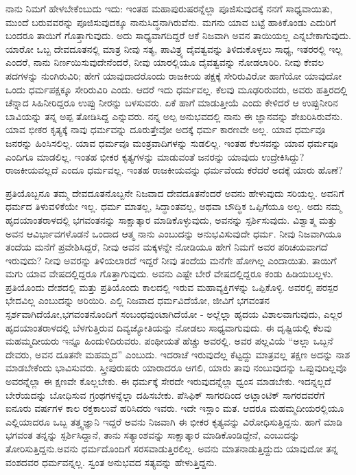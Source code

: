 ನಾನು ನಿಮಗೆ ಹೇಳಬೇಕೆಂಬುದು ಇದು: ಇಂತಹ ಮಹಾಪುರುಷರನ್ನೆಲ್ಲಾ ಪೂಜಿಸುವುದಕ್ಕೆ ನನಗೆ ಸಾಧ್ಯವಾಯಿತು, ಮುಂದೆ ಬರುವವರನ್ನು ಪೂಜಿಸುವುದಕ್ಕೂ ನಾನು\break ಸಿದ್ಧನಾಗಿರುವೆನು. ಮಗನು ಯಾವ ಬಟ್ಟೆ ಹಾಕಿಕೊಂಡು ಎದುರಿಗೆ ಬಂದರೂ ತಾಯಿಗೆ ಗೊತ್ತಾಗುವುದು. ಅದು ಸಾಧ್ಯವಾಗದಿದ್ದರೆ ಆಕೆ ನಿಜವಾಗಿ ಅವನ ತಾಯಿಯಲ್ಲ ಎನ್ನ\-ಬೇಕಾಗುವುದು. ಯಾರೋ ಒಬ್ಬ ದೇವದೂತನಲ್ಲಿ ಮಾತ್ರ ನೀವು ಸತ್ಯ, ಪಾವಿತ್ರ್ಯ ದೈವತ್ವವನ್ನು ತಿಳಿದುಕೊಳ್ಳಲು ಸಾಧ್ಯ, ಇತರರಲ್ಲಿ ಇಲ್ಲ ಎಂದರೆ, ನಾನು ನಿರ್ಣಯಿಸುವುದೇನೆಂದರೆ, ನೀವು ಯಾರಲ್ಲಿಯೂ ದೈವತ್ವವನ್ನು ನೋಡಲಾರಿರಿ. ನೀವು ಕೇವಲ ಪದಗಳನ್ನು ನುಂಗಿರುವಿರಿ; ಹೇಗೆ ಯಾವುದಾದರೊಂದು ರಾಜಕೀಯ ಪಕ್ಷಕ್ಕೆ ಸೇರಿರುವಿರೋ ಹಾಗೆಯೋ ಯಾವುದೋ ಒಂದು ಧರ್ಮಪಕ್ಷಕ್ಕೂ ಸೇರಿರುವಿರಿ ಎಂದು. ಆದರೆ ಇದು ಧರ್ಮವಲ್ಲ. ಕೆಲವು ಮೂಢರಿರುವರು, ಅವರು ಹತ್ತಿರದಲ್ಲಿ ಚೆನ್ನಾದ ಸಿಹಿನೀರಿದ್ದರೂ ಉಪ್ಪು ನೀರನ್ನು ಬಳಸುವರು. ಏಕೆ ಹಾಗೆ ಮಾಡುತ್ತೀಯೆ ಎಂದು ಕೇಳಿದರೆ ಆ ಉಪ್ಪುನೀರಿನ ಬಾವಿಯನ್ನು ತನ್ನ ಅಪ್ಪ ತೋಡಿಸಿದ್ದ ಎನ್ನುವರು. ನನ್ನ ಅಲ್ಪ ಅನುಭವದಲ್ಲಿ ನಾನು ಈ ಜ್ಞಾನವನ್ನು ಶೇಖರಿಸಿರುವೆನು. ಯಾವ ಭೀಕರ ಕೃತ್ಯಕ್ಕೆ ನಾವು ಧರ್ಮವನ್ನು ದೂರುತ್ತೇವೋ ಅದಕ್ಕೆ ಧರ್ಮ ಕಾರಣವೇ ಅಲ್ಲ. ಯಾವ ಧರ್ಮವೂ ಜನರನ್ನು ಹಿಂಸಿಸಲಿಲ್ಲ. ಯಾವ ಧರ್ಮವೂ ಮಂತ್ರವಾದಿಗಳನ್ನು ಸುಡಲಿಲ್ಲ. ಇಂತಹ ಕೆಲಸವನ್ನು ಯಾವ ಧರ್ಮವೂ ಎಂದಿಗೂ ಮಾಡಲಿಲ್ಲ. ಇಂತಹ ಭೀಕರ ಕೃತ್ಯಗಳನ್ನು ಮಾಡುವಂತೆ ಜನರನ್ನು ಯಾವುದು ಉದ್ರೇಕಿಸಿದ್ದು? ರಾಜಕೀಯವಲ್ಲದೆ ಎಂದೂ ಧರ್ಮವಲ್ಲ. ಇಂತಹ ರಾಜಕೀಯವನ್ನು ಧರ್ಮವೆಂದು ಕರೆದರೆ ಅದಕ್ಕೆ ಯಾರು ಹೊಣೆ?

ಪ್ರತಿಯೊಬ್ಬನೂ ತಮ್ಮ ದೇವದೂತನೊಬ್ಬನೇ ನಿಜವಾದ ದೇವದೂತನೆಂದರೆ ಅವನು ಹೇಳುವುದು ಸರಿಯಲ್ಲ. ಅವನಿಗೆ ಧರ್ಮದ ತಿಳುವಳಿಕೆಯೇ ಇಲ್ಲ. ಧರ್ಮ ಮಾತಲ್ಲ, ಸಿದ್ಧಾಂತವಲ್ಲ, ಅಥವಾ ಬೌದ್ಧಿಕ ಒಪ್ಪಿಗೆಯೂ ಅಲ್ಲ. ಅದು ನಮ್ಮ ಹೃದಯಾಂತರಾಳದಲ್ಲಿ ಭಗವಂತನನ್ನು ಸಾಕ್ಷಾತ್ಕಾರ ಮಾಡಿಕೊಳ್ಳುವುದು, ಅವನನ್ನು ಸ್ಪರ್ಶಿಸುವುದು. ವಿಶ್ವಾತ್ಮ ಮತ್ತು ಅವನ ಆವಿರ್ಭಾವಗಳೊಡನೆ ಒಂದಾದ ಆತ್ಮ ನಾನು ಎಂಬುದನ್ನು ಅನುಭವಿಸುವುದೇ ಧರ್ಮ. ನೀವು ನಿಜವಾಗಿಯೂ ತಂದೆಯ ಮನೆಗೆ ಪ್ರವೇಶಿಸಿದ್ದರೆ, ನೀವು ಅವನ ಮಕ್ಕಳನ್ನೇ ನೋಡಿಯೂ ಹೇಗೆ ನಿಮಗೆ ಅವರ ಪರಿಚಯವಾಗದೆ ಇರುವುದು? ನೀವು ಅವರನ್ನು ತಿಳಿಯಲಾರದೆ ಇದ್ದರೆ ನೀವು ತಂದೆಯ ಮನೆಗೇ ಹೋಗಿಲ್ಲ ಎಂದಾಯಿತು. ತಾಯಿಗೆ ಮಗು ಯಾವ ವೇಷದಲ್ಲಿದ್ದರೂ ಗೊತ್ತಾಗುವುದು. ಅವನು ಎಷ್ಟೇ ಬೇರೆ ವೇಷದಲ್ಲಿದ್ದರೂ ಕಂಡು ಹಿಡಿಯಬಲ್ಲಳು. ಪ್ರತಿಯೊಂದು ದೇಶದಲ್ಲಿ ಮತ್ತು ಪ್ರತಿಯೊಂದು ಕಾಲದಲ್ಲಿ ಇರುವ ಮಹಾವ್ಯಕ್ತಿಗಳನ್ನು ಒಪ್ಪಿಕೊಳ್ಳಿ. ಅವರಲ್ಲಿ ಪರಸ್ಪರ ಭೇದವಿಲ್ಲ ಎಂಬುದನ್ನು ಅರಿಯಿರಿ. ಎಲ್ಲಿ ನಿಜವಾದ ಧರ್ಮವಿದೆಯೋ, ಜೀವಿಗೆ ಭಗವಂತನ ಸ್ಪರ್ಶವಾಗಿದೆಯೋ,\break ಭಗವಂತನೊಂದಿಗೆ ಸಂಬಂಧವುಂಟಾಗಿದೆಯೋ - ಅಲ್ಲೆಲ್ಲಾ ಹೃದಯ ವಿಶಾಲವಾಗುವುದು, ಎಲ್ಲರ ಹೃದಯಾಂತರಾಳದಲ್ಲಿ ಬೆಳಗುತ್ತಿರುವ ದಿವ್ಯಜ್ಯೋತಿಯನ್ನು ನೋಡಲು ಸಾಧ್ಯವಾಗುವುದು. ಈ ದೃಷ್ಟಿಯಲ್ಲಿ ಕೆಲವು ಮಹಮ್ಮದೀಯರು ಇನ್ನೂ ಹಿಂದುಳಿದಿರುವರು. ಪಂಥೀಯತೆ ಹೆಚ್ಚು ಅವರಲ್ಲಿ. ಅವರ ಪಲ್ಲವಿಯೆ “ಅಲ್ಲಾ ಒಬ್ಬನೆ ದೇವರು, ಅವನ ದೂತನೇ ಮಹಮ್ಮದ” ಎಂಬುದು. ಇದರಾಚೆ ಇರುವುದೆಲ್ಲ ಕೆಟ್ಟದ್ದು ಮಾತ್ರವಲ್ಲ ತಕ್ಷಣ ಅದನ್ನು ನಾಶ ಮಾಡಬೇಕೆಂದು ಭಾವಿಸುವರು. ಸ್ತ್ರೀಪುರುಷರು ಯಾರಾದರೂ ಆಗಲಿ, ಯಾರು ತಾವು ನಂಬುವುದನ್ನು ಒಪ್ಪುವುದಿಲ್ಲವೊ ಅವರನ್ನೆಲ್ಲಾ ಈ ಕ್ಷಣವೇ ಕೊಲ್ಲಬೇಕು. ಈ ಧರ್ಮಕ್ಕೆ ಸೇರದೇ ಇರುವುದನ್ನೆಲ್ಲಾ ಧ್ವಂಸ ಮಾಡಬೇಕು. ಇದನ್ನಲ್ಲದೆ ಬೇರೆಯದನ್ನು ಬೋಧಿಸುವ ಗ್ರಂಥಗಳನ್ನೆಲ್ಲಾ ದಹಿಸಬೇಕು. ಪೆಸಿಫಿಕ್​ ಸಾಗರದಿಂದ ಅಟ್ಲಾಂಟಿಕ್​ ಸಾಗರದವರೆಗೆ ಐನೂರು ವರ್ಷಗಳ ಕಾಲ ರಕ್ತಕಾಲುವೆ ಹರಿಸಿದರು ಇವರು. ಇದೇ ಇಸ್ಲಾಂ ಮತ. ಆದರೂ ಮಹಮ್ಮದೀಯರಲ್ಲಿಯೂ ಎಲ್ಲಿಯಾದರೂ ಒಬ್ಬ ತತ್ತ್ವಜ್ಞಾನಿ ಇದ್ದರೆ ಅವನು ನಿಜವಾಗಿ ಈ ಭೀಕರ ಕೃತ್ಯವನ್ನು ವಿರೋಧಿಸುತ್ತಿದ್ದನು. ಹಾಗೆ ಮಾಡಿ ಭಗವಂತ ತನ್ನನ್ನು ಸ್ಪರ್ಶಿಸಿದ್ದಾನೆ, ತಾನು ಸತ್ಯಾಂಶವನ್ನು ಸಾಕ್ಷಾತ್ಕಾರ ಮಾಡಿಕೊಂಡಿದ್ದೇನೆ, ಎಂಬುದನ್ನು ತೋರಿಸುತ್ತಿದ್ದನು.ಅವನು ಧರ್ಮದೊಂದಿಗೆ ಸರಸವಾಡುತ್ತಿರಲಿಲ್ಲ. ಅವನು ಮಾತನಾಡುತ್ತಿದ್ದುದು ಯಾವುದೋ ತನ್ನ ವಂಶದವರ ಧರ್ಮವನ್ನಲ್ಲ. ಸ್ವಂತ ಅನುಭವದ ಸತ್ಯವನ್ನು ಹೇಳುತ್ತಿದ್ದನು.

